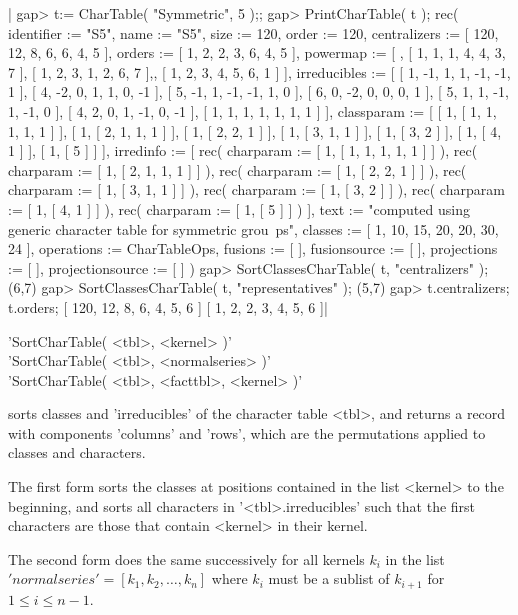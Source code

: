 |    gap> t:= CharTable( "Symmetric", 5 );;
    gap> PrintCharTable( t );
    rec( identifier := "S5", name := "S5", size := 120, order :=
    120, centralizers := [ 120, 12, 8, 6, 6, 4, 5 ], orders :=
    [ 1, 2, 2, 3, 6, 4, 5 ], powermap :=
    [ , [ 1, 1, 1, 4, 4, 3, 7 ], [ 1, 2, 3, 1, 2, 6, 7 ],,
      [ 1, 2, 3, 4, 5, 6, 1 ] ], irreducibles :=
    [ [ 1, -1, 1, 1, -1, -1, 1 ], [ 4, -2, 0, 1, 1, 0, -1 ],
      [ 5, -1, 1, -1, -1, 1, 0 ], [ 6, 0, -2, 0, 0, 0, 1 ],
      [ 5, 1, 1, -1, 1, -1, 0 ], [ 4, 2, 0, 1, -1, 0, -1 ],
      [ 1, 1, 1, 1, 1, 1, 1 ] ], classparam :=
    [ [ 1, [ 1, 1, 1, 1, 1 ] ], [ 1, [ 2, 1, 1, 1 ] ], [ 1, [ 2, 2, 1 ] ],
      [ 1, [ 3, 1, 1 ] ], [ 1, [ 3, 2 ] ], [ 1, [ 4, 1 ] ], [ 1, [ 5 ] ]
     ], irredinfo := [ rec(
          charparam := [ 1, [ 1, 1, 1, 1, 1 ] ] ), rec(
          charparam := [ 1, [ 2, 1, 1, 1 ] ] ), rec(
          charparam := [ 1, [ 2, 2, 1 ] ] ), rec(
          charparam := [ 1, [ 3, 1, 1 ] ] ), rec(
          charparam := [ 1, [ 3, 2 ] ] ), rec(
          charparam := [ 1, [ 4, 1 ] ] ), rec(
          charparam := [ 1, [ 5 ] ] )
     ], text := "computed using generic character table for symmetric grou\
    ps", classes := [ 1, 10, 15, 20, 20, 30, 24
     ], operations := CharTableOps, fusions := [  ], fusionsource :=
    [  ], projections := [  ], projectionsource := [  ] )
    gap> SortClassesCharTable( t, "centralizers" );
    (6,7)
    gap> SortClassesCharTable( t, "representatives" );
    (5,7)
    gap> t.centralizers; t.orders;
    [ 120, 12, 8, 6, 4, 5, 6 ]
    [ 1, 2, 2, 3, 4, 5, 6 ]|

\Section{SortCharTable}%
%

'SortCharTable( <tbl>, <kernel> )'\\
'SortCharTable( <tbl>, <normalseries> )'\\
'SortCharTable( <tbl>, <facttbl>, <kernel> )'

sorts classes and 'irreducibles' of the character table <tbl>, and
returns a record with components 'columns' and 'rows', which are the
permutations applied to classes and characters.

The first form sorts the classes at positions contained in the list
<kernel> to the beginning, and sorts all characters in
'<tbl>.irreducibles' such that the first characters are those that
contain <kernel> in their kernel.

The second form does the same successively for all kernels $k_i$ in
the list $'normalseries' = [ k_1, k_2, \ldots, k_n ]$ where
$k_i$ must be a sublist of $k_{i+1}$ for $1 \leq i \leq n-1$.

